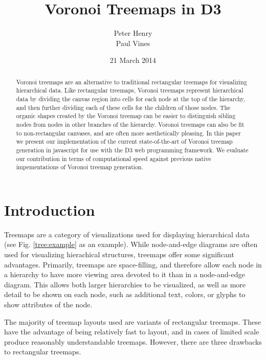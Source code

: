 \documentclass{acm_proc_article-sp} \usepackage{cite}
\begin{document}
\title{Voronoi Treemaps in D3}

 \author{ \alignauthor Peter Henry
  \\ 
  \alignauthor Paul Vines \\  } \date{21 March
  2014}

\maketitle
\begin{abstract}
Voronoi treemaps are an alternative to traditional rectangular
treemaps for visualizing hierarchical data. Like rectangular treemaps,
Voronoi treemaps represent hierarchical data by dividing the canvas
region into cells for each node at the top of the hierarchy, and then
further dividing each of these cells for the children of those
nodes. The organic shapes created by the Voronoi treemap can be easier
to distinguish sibling nodes from nodes in other branches of the
hierarchy. Voronoi treemaps can also be fit to non-rectangular
canvases, and are often more aesthetically pleasing. In this paper we
present our implementation of the current state-of-the-art of Voronoi
treemap generation in javascript for use with the D3 web programming
framework. We evaluate our contribution in terms of computational
speed against previous native impementations of Voronoi treemap
generation.
\end{abstract}

\section{Introduction}
\label{sec:introduction}
Treemaps are a category of visualizations used for displaying
hierarchical data (see Fig. \ref{tree:example} as an example). While
node-and-edge diagrams are often used for visualizing hierachical
structures, treemaps offer some significant advantages. Primarily,
treemaps are space-filling, and therefore allow each node in a
hierarchy to have more viewing area devoted to it than in a
node-and-edge diagram. This allows both larger hierarchies to be
visualized, as well as more detail to be shown on each node, such as
additional text, colors, or glyphs to show attributes of the node.

The majority of treemap layouts used are variants of rectangular
treemaps. These have the advantage of being relatively fast to layout,
and in cases of limited scale produce reasonably understandable
treemaps. However, there are three drawbacks to rectangular treemaps.
\end{document}
